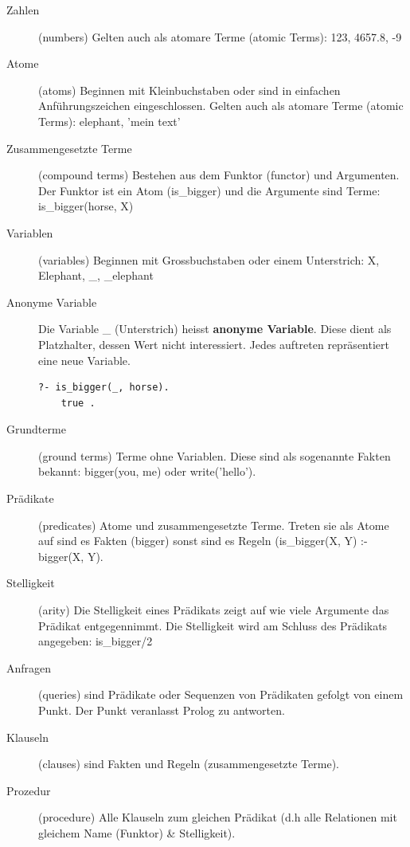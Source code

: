 \begin{description}
	\item[Zahlen] (numbers) Gelten auch als atomare Terme (atomic Terms): 123, 4657.8, -9
	
	\item[Atome] (atoms) Beginnen mit Kleinbuchstaben oder sind in einfachen Anführungszeichen eingeschlossen. Gelten auch als atomare Terme (atomic Terms): elephant, 'mein text'
	
		\item[Zusammengesetzte Terme] (compound terms) Bestehen aus dem Funktor (functor) und Argumenten. Der Funktor ist ein Atom (is\_bigger) und die Argumente sind Terme: is\_bigger(horse, X)
	
	\item[Variablen] (variables) Beginnen mit Grossbuchstaben oder einem Unterstrich: X, Elephant, \_, \_elephant
	
	\item[Anonyme Variable] Die Variable \_ (Unterstrich) heisst \textbf{anonyme Variable}. Diese dient als Platzhalter, dessen Wert nicht interessiert. Jedes auftreten repräsentiert eine neue Variable. 
	
	\begin{lstlisting}[caption=Anfrage mit anonymer Variable]
	?- is_bigger(_, horse).
	true .
	\end{lstlisting}
		
	\item[Grundterme] (ground terms) Terme ohne Variablen. Diese sind als sogenannte Fakten bekannt: bigger(you, me) oder write('hello').
	
	\item[Prädikate] (predicates) Atome und zusammengesetzte Terme. Treten sie als Atome auf sind es Fakten (bigger) sonst sind es Regeln (is\_bigger(X, Y) :- bigger(X, Y).
	
	\item[Stelligkeit] (arity) Die Stelligkeit eines Prädikats zeigt auf wie viele Argumente das Prädikat entgegennimmt. Die Stelligkeit wird am Schluss des Prädikats angegeben: is\_bigger/2
	
	\item[Anfragen] (queries) sind Prädikate oder Sequenzen von Prädikaten gefolgt von einem Punkt. Der Punkt veranlasst Prolog zu antworten.
	
	\item[Klauseln] (clauses) sind Fakten und Regeln (zusammengesetzte Terme).
	
	\item[Prozedur] (procedure) Alle Klauseln zum gleichen Prädikat (d.h alle Relationen mit gleichem Name (Funktor) \& Stelligkeit).
	

\end{description}
